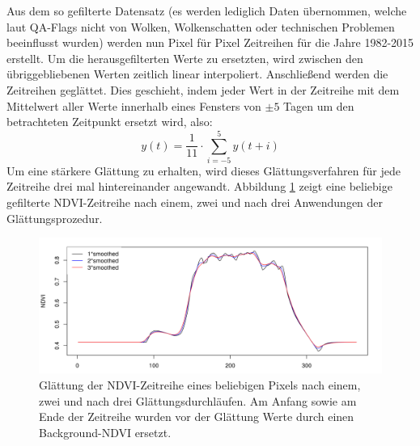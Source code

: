 \documentclass[]{article}
\begin{document}
Aus dem so gefilterte Datensatz (es werden lediglich Daten übernommen, welche laut QA-Flags nicht von Wolken, Wolkenschatten oder technischen Problemen beeinflusst wurden) werden nun Pixel für Pixel Zeitreihen für die Jahre 1982-2015 erstellt. Um die herausgefilterten Werte zu ersetzten, wird zwischen den übriggebliebenen Werten zeitlich linear interpoliert. Anschließend werden die Zeitreihen geglättet. Dies geschieht, indem jeder Wert in der Zeitreihe mit dem Mittelwert aller Werte innerhalb eines Fensters von $\pm 5$ Tagen um den betrachteten Zeitpunkt ersetzt wird, also:
\begin{equation}
y(t)=\frac{1}{11}\cdot \sum_{i=-5}^{5} y(t+i)
\end{equation}
Um eine stärkere Glättung zu erhalten, wird dieses Glättungsverfahren für jede Zeitreihe drei mal hintereinander angewandt. Abbildung \ref{smoothe} zeigt eine beliebige gefilterte NDVI-Zeitreihe nach einem, zwei und nach drei Anwendungen der Glättungsprozedur. 

\begin{figure}
  \includegraphics[width=1.\textwidth]{smoothe.png}
	\caption{Glättung der NDVI-Zeitreihe eines beliebigen Pixels nach einem, zwei und nach drei Glättungsdurchläufen. Am Anfang sowie am Ende der Zeitreihe wurden vor der Glättung Werte durch einen Background-NDVI ersetzt.}
	\label{smoothe}
\end{figure}
\end{document}
